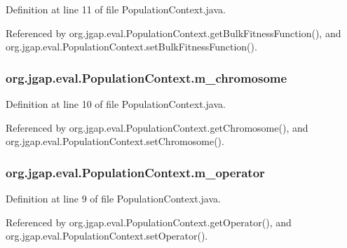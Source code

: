 Definition at line 11 of file Population\-Context.\-java.



Referenced by org.\-jgap.\-eval.\-Population\-Context.\-get\-Bulk\-Fitness\-Function(), and org.\-jgap.\-eval.\-Population\-Context.\-set\-Bulk\-Fitness\-Function().

\hypertarget{classorg_1_1jgap_1_1eval_1_1_population_context_a26a703dc95c171c546cc3101ff38aef3}{
\subsubsection[{m\-\_\-chromosome}]{ org.\-jgap.\-eval.\-Population\-Context.\-m\-\_\-chromosome\hspace{0.3cm}{\ttfamily [private]}}}\label{classorg_1_1jgap_1_1eval_1_1_population_context_a26a703dc95c171c546cc3101ff38aef3}


Definition at line 10 of file Population\-Context.\-java.



Referenced by org.\-jgap.\-eval.\-Population\-Context.\-get\-Chromosome(), and org.\-jgap.\-eval.\-Population\-Context.\-set\-Chromosome().

\hypertarget{classorg_1_1jgap_1_1eval_1_1_population_context_adc2a1b84dd5267c5755d052ddf09fe60}{
\subsubsection[{m\-\_\-operator}]{ org.\-jgap.\-eval.\-Population\-Context.\-m\-\_\-operator\hspace{0.3cm}{\ttfamily [private]}}}\label{classorg_1_1jgap_1_1eval_1_1_population_context_adc2a1b84dd5267c5755d052ddf09fe60}


Definition at line 9 of file Population\-Context.\-java.



Referenced by org.\-jgap.\-eval.\-Population\-Context.\-get\-Operator(), and org.\-jgap.\-eval.\-Population\-Context.\-set\-Operator().

